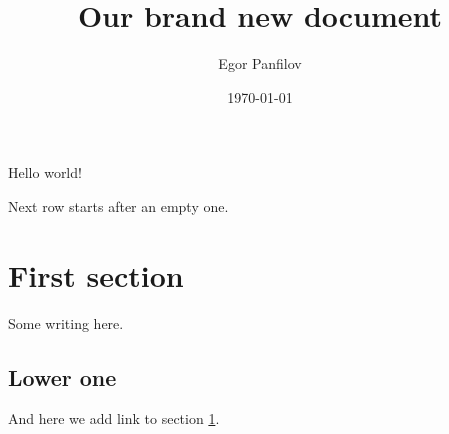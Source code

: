 \documentclass[a4paper,12pt]{article}
\author{Egor Panfilov}
\title{Our brand new document}
\date{\today}
\begin{document}
\maketitle

Hello world!

Next row starts after an empty one.

\section{First section}\label{razdel}

Some writing here.

\subsection{Lower one}

And here we add link to section \ref{razdel}.
\end{document}
